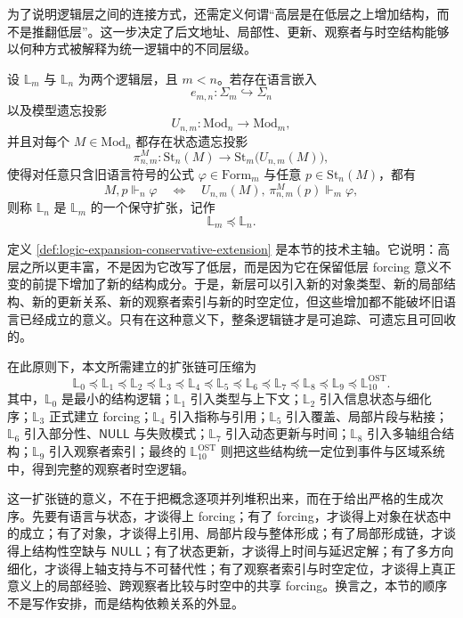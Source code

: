 为了说明逻辑层之间的连接方式，还需定义何谓“高层是在低层之上增加结构，而不是推翻低层”。这一步决定了后文地址、局部性、更新、观察者与时空结构能够以何种方式被解释为统一逻辑中的不同层级。

\begin{definition}[保守扩张]\label{def:logic-expansion-conservative-extension}
设 \(\mathbb{L}_m\) 与 \(\mathbb{L}_n\) 为两个逻辑层，且 \(m<n\)。若存在语言嵌入
\[
e_{m,n}:\Sigma_m\hookrightarrow \Sigma_n
\]
以及模型遗忘投影
\[
U_{n,m}:\mathrm{Mod}_n\to \mathrm{Mod}_m,
\]
并且对每个 \(M\in\mathrm{Mod}_n\) 都存在状态遗忘投影
\[
\pi_{n,m}^M:\mathrm{St}_n(M)\to \mathrm{St}_m\bigl(U_{n,m}(M)\bigr),
\]
使得对任意只含旧语言符号的公式 \(\varphi\in \mathrm{Form}_m\) 与任意 \(p\in \mathrm{St}_n(M)\)，都有
\[
M,p\Vdash_n \varphi
\quad\Longleftrightarrow\quad
U_{n,m}(M),\,\pi_{n,m}^M(p)\Vdash_m \varphi,
\]
则称 \(\mathbb{L}_n\) 是 \(\mathbb{L}_m\) 的一个保守扩张，记作
\[
\mathbb{L}_m \preceq \mathbb{L}_n.
\]
\end{definition}

定义 \ref{def:logic-expansion-conservative-extension} 是本节的技术主轴。它说明：高层之所以更丰富，不是因为它改写了低层，而是因为它在保留低层 forcing 意义不变的前提下增加了新的结构成分。于是，新层可以引入新的对象类型、新的局部结构、新的更新关系、新的观察者索引与新的时空定位，但这些增加都不能破坏旧语言已经成立的意义。只有在这种意义下，整条逻辑链才是可追踪、可遗忘且可回收的。

在此原则下，本文所需建立的扩张链可压缩为
\[
\mathbb{L}_0
\preceq
\mathbb{L}_1
\preceq
\mathbb{L}_2
\preceq
\mathbb{L}_3
\preceq
\mathbb{L}_4
\preceq
\mathbb{L}_5
\preceq
\mathbb{L}_6
\preceq
\mathbb{L}_7
\preceq
\mathbb{L}_8
\preceq
\mathbb{L}_9
\preceq
\mathbb{L}_{10}^{\mathrm{OST}}.
\]
其中，\(\mathbb{L}_0\) 是最小的结构逻辑；\(\mathbb{L}_1\) 引入类型与上下文；\(\mathbb{L}_2\) 引入信息状态与细化序；\(\mathbb{L}_3\) 正式建立 forcing；\(\mathbb{L}_4\) 引入指称与引用；\(\mathbb{L}_5\) 引入覆盖、局部片段与粘接；\(\mathbb{L}_6\) 引入部分性、\(\mathsf{NULL}\) 与失败模式；\(\mathbb{L}_7\) 引入动态更新与时间；\(\mathbb{L}_8\) 引入多轴组合结构；\(\mathbb{L}_9\) 引入观察者索引；最终的 \(\mathbb{L}_{10}^{\mathrm{OST}}\) 则把这些结构统一定位到事件与区域系统中，得到完整的观察者时空逻辑。

这一扩张链的意义，不在于把概念逐项并列堆积出来，而在于给出严格的生成次序。先要有语言与状态，才谈得上 forcing；有了 forcing，才谈得上对象在状态中的成立；有了对象，才谈得上引用、局部片段与整体形成；有了局部形成链，才谈得上结构性空缺与 \(\mathsf{NULL}\)；有了状态更新，才谈得上时间与延迟定解；有了多方向细化，才谈得上轴支持与不可替代性；有了观察者索引与时空定位，才谈得上真正意义上的局部经验、跨观察者比较与时空中的共享 forcing。换言之，本节的顺序不是写作安排，而是结构依赖关系的外显。

